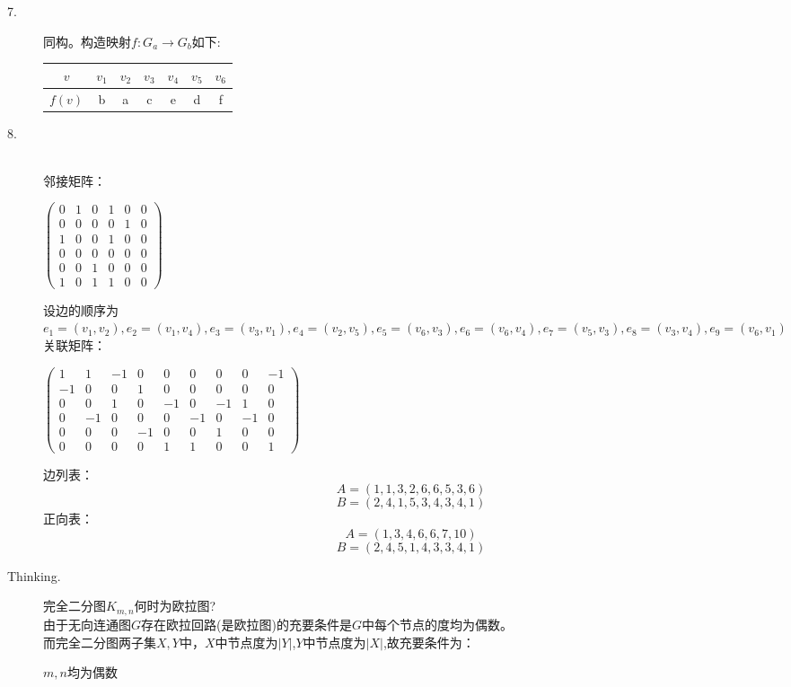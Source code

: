 \documentclass[UTF8, onecolumn, a4paper]{article}
\begin{document}
\begin{description}
\item[7.]
同构。构造映射$f:G_a\rightarrow G_b$如下:
\begin{center}
	\begin{tabular}{ccccccc}
	\hline
		$v$ & $v_1$ & $v_2$ & $v_3$ &  $v_4$ & $v_5$ & $v_6$\\
	\hline
		$f(v)$&b & a& c & e & d & f  \\
	\hline
	\end{tabular}
\end{center}
\item[8.]\quad\\
邻接矩阵：
\begin{center}
$\begin{pmatrix}
	0 & 1 & 0 & 1 & 0 & 0\\
	0 & 0 & 0 & 0 & 1 & 0\\
	1 & 0 & 0 & 1 & 0 & 0\\
	0 & 0 & 0 & 0 & 0 & 0\\
	0 & 0 & 1 & 0 & 0 & 0\\
	1 & 0 & 1 & 1 & 0 & 0
\end{pmatrix}$
\end{center}
设边的顺序为$e_1 = (v_1, v_2), e_2 = (v_1, v_4), e_3 = (v_3, v_1), e_4 = (v_2, v_5), e_5 = (v_6, v_3), e_6 = (v_6, v_4), e_7 = (v_5, v_3), e_8 = (v_3, v_4), e_9 = (v_6, v_1)$\\
关联矩阵：
\begin{center}
$\begin{pmatrix}
1 & 1 & -1 & 0 & 0 & 0 & 0 & 0 & -1\\
-1 & 0 & 0 & 1 & 0 & 0 & 0 & 0 & 0\\
0 & 0 & 1 & 0 & -1 & 0 & -1 & 1 & 0 \\
0 & -1 & 0 & 0 & 0 & -1 & 0 & -1 & 0 \\
0 & 0 & 0 & -1 & 0 & 0 & 1 & 0 & 0\\
0 & 0 & 0 & 0 & 1 & 1 & 0 & 0 & 1
\end{pmatrix}$
\end{center}
边列表：
$$A = (1, 1, 3, 2, 6, 6, 5, 3, 6)$$
$$B = (2, 4, 1, 5, 3, 4, 3, 4 ,1)$$
正向表：
$$A = (1, 3, 4, 6, 6, 7, 10)$$
$$B = (2, 4, 5, 1, 4, 3, 3, 4 ,1)$$

\item[Thinking.]
完全二分图$K_{m, n}$何时为欧拉图?\\
由于无向连通图$G$存在欧拉回路(是欧拉图)的充要条件是$G$中每个节点的度均为偶数。\\
而完全二分图两子集$X, Y$中，$X$中节点度为$|Y|$,$Y$中节点度为$|X|$,故充要条件为：
\begin{center}
	$m, n$均为偶数
\end{center}


\end{description}
\end{document}

